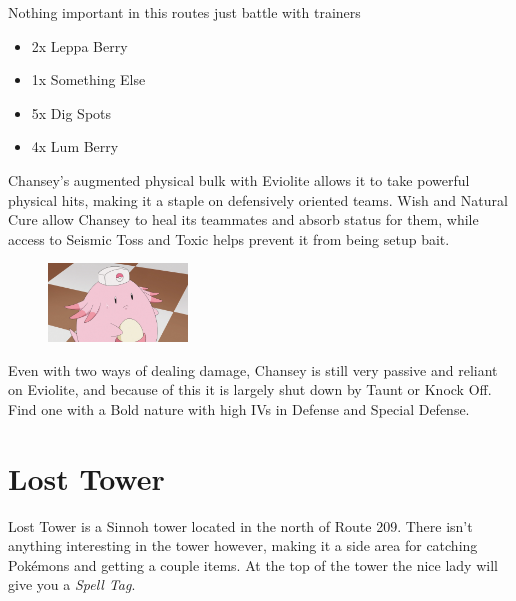 \documentclass[11pt]{article}
\begin{document}
Nothing important in this routes just battle with trainers


\begin{itemize}
    \item 2x Leppa Berry
    \item 1x Something Else
    \item 5x Dig Spots
    \item 4x Lum Berry
\end{itemize}





\begin{mdframed}[style=MyFrame,nobreak=true,frametitle={Pokemon Spotlight: Chansey}]

Chansey's augmented physical bulk with Eviolite allows it to take powerful physical hits,
making it a staple on defensively oriented teams.
Wish and Natural Cure allow Chansey to heal its teammates and absorb status for them,
while access to Seismic Toss and Toxic helps prevent it from being setup bait.

\begin{figure}
\includegraphics[width=0.33\textwidth]{walkthrough/Sinnoh/spotlight-chansey}
\label{fig:spotlight-chansey}
\end{figure}

Even with two ways of dealing damage, Chansey is still very passive and reliant on
Eviolite, and because of this it is largely shut down by Taunt or Knock Off.
Find one with a Bold nature with high IVs in Defense and Special Defense.

\end{mdframed}

\section{Lost Tower}\label{sec:Lost_Tower}

Lost Tower is a Sinnoh tower located in the north of Route 209.
There isn’t anything interesting in the tower however,
making it a side area for catching Pokémons and getting a couple items.
At the top of the tower the nice lady will give you a \emph{Spell Tag}.
\end{document}
